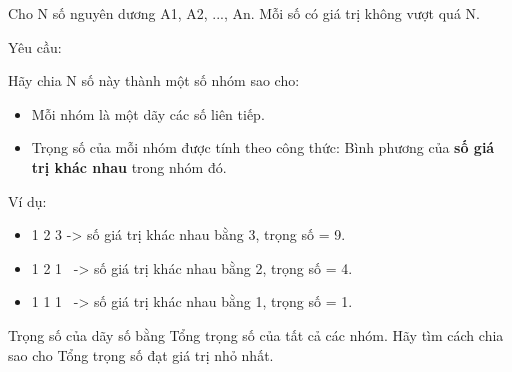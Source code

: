 Cho N số nguyên dương A1, A2, ..., An. Mỗi số có giá trị không vượt quá N.

Yêu cầu:

Hãy chia N số này thành một số nhóm sao cho:
\begin{itemize}
	\item Mỗi nhóm là một dãy các số liên tiếp.
	\item Trọng số của mỗi nhóm được tính theo công thức: Bình phương của \textbf{số giá trị khác nhau} trong nhóm đó.
\end{itemize}

Ví dụ:
\begin{itemize}
	\item 1 2 3 -> số giá trị khác nhau bằng 3, trọng số = 9.
	\item 1 2 1  -> số giá trị khác nhau bằng 2, trọng số = 4.
	\item 1 1 1  -> số giá trị khác nhau bằng 1, trọng số = 1.
\end{itemize}

Trọng số của dãy số bằng Tổng trọng số của tất cả các nhóm. Hãy tìm cách chia sao cho Tổng trọng số đạt giá trị nhỏ nhất.